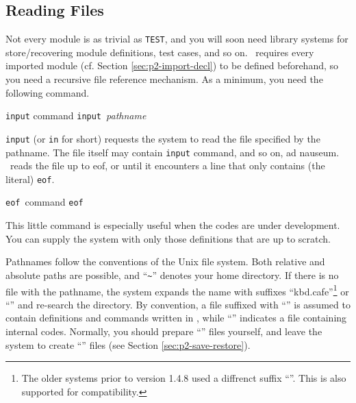 \documentclass[a4paper]{memoir}
\begin{document}
\subsection{Reading Files}\label{sec:p2-reading-files}

Not every module is as trivial as \verb|TEST|, and you will %
soon need library systems for store/recovering module definitions,
test cases, and so on. \cafeobj~requires every imported module
(cf. Section 
\ref{sec:p2-import-decl}) to be
defined beforehand, so you need a recursive file reference
mechanism. As a minimum, you need the following command.

\begin{bsyntax} \texttt{input} command\Hline
\texttt{input}~\textit{pathname}
\end{bsyntax}

\verb|input| (or \verb|in| for short)
requests the system to read the file specified by the
pathname. The file itself may contain \verb|input| command, and so on,
ad nauseum. \cafeobj~reads the file up to eof, or until it encounters
a line that only contains (the literal) \verb|eof|.

\begin{bsyntax} \texttt{eof}~command \Hline
\texttt{eof}
\end{bsyntax}

This little command is especially useful when the %
codes are under development. You can supply the system with only those
definitions that are up to scratch.

Pathnames follow the conventions of the Unix file system. Both
relative and absolute paths are possible, and
``\verb|~|'' 
denotes your home directory.
If there is no file with the pathname, the system expands the name
with suffixes ``kbd{.cafe}''\footnote{The older systems prior
  to version 1.4.8 used a diffrenct suffix ``''. 
  This is also supported for compatibility.}
 
or ``''
 and re-search the
directory. By convention, a file suffixed with ``'' is assumed
to contain definitions and commands written in \cafeobj, 
while ``''
indicates a file containing internal codes. Normally, you should prepare
``'' files yourself, and leave the system to create
``'' files (see Section \ref{sec:p2-save-restore}).
\end{document}
